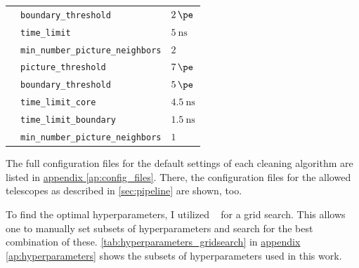 \begin{table}
{\begin{tabular}{l l l}
                    & \texttt{boundary\_threshold}              & \qquad\(\SI{2}{\pe}\) \\
                    & \texttt{time\_limit}                      & \qquad\(\SI{5}{\nano\second}\) \\
                    & \texttt{min\_number\_picture\_neighbors}  & \qquad\(\num{2}\) \\
        \addlinespace[0.5em]
        \tcc{}      & \texttt{picture\_threshold}               & \qquad\(\SI{7}{\pe}\) \\
                    & \texttt{boundary\_threshold}              & \qquad\(\SI{5}{\pe}\) \\
                    & \texttt{time\_limit\_core}                & \qquad\(\SI{4.5}{\nano\second}\) \\
                    & \texttt{time\_limit\_boundary}            & \qquad\(\SI{1.5}{\nano\second}\) \\
                    & \texttt{min\_number\_picture\_neighbors}  & \qquad\(\num{1}\) \\
  \end{tabular}}
\end{table}

The full configuration files for the default settings of each cleaning algorithm are listed in
\hyperref[ap:config_files]{appendix \ref{ap:config_files}}. There, the configuration files for the allowed telescopes
as described in \autoref{sec:pipeline} are shown, too.

To find the optimal hyperparameters, I utilized \sklearn{}~\cite{scikit-learn} for a grid search. This
allows one to manually set subsets of hyperparameters and search for the best combination of these.
\autoref{tab:hyperparameters_gridsearch} in \hyperref[ap:hyperparameters]{appendix \ref{ap:hyperparameters}} shows
the subsets of hyperparameters used in this work.

